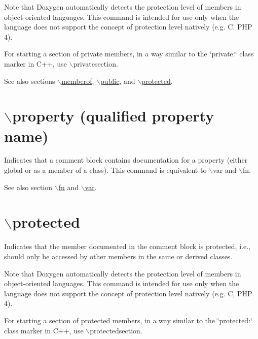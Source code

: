 Note that Doxygen automatically detects the protection level of members in object-\/oriented languages. This command is intended for use only when the language does not support the concept of protection level natively (e.g. C, PHP 4).

For starting a section of private members, in a way similar to the \char`\"{}private:\char`\"{} class marker in C++, use $\backslash$privatesection.

\begin{DoxySeeAlso}{See also}
sections \hyperlink{commands_cmdmemberof}{$\backslash$memberof}, \hyperlink{commands_cmdpublic}{$\backslash$public}, and \hyperlink{commands_cmdprotected}{$\backslash$protected}.
\end{DoxySeeAlso}


 \hypertarget{commands_cmdproperty}{}\section{$\backslash$property (qualified property name)}\label{commands_cmdproperty}
 Indicates that a comment block contains documentation for a property (either global or as a member of a class). This command is equivalent to $\backslash$var and $\backslash$fn.

\begin{DoxySeeAlso}{See also}
section \hyperlink{commands_cmdfn}{$\backslash$fn} and \hyperlink{commands_cmdvar}{$\backslash$var}.
\end{DoxySeeAlso}


 \hypertarget{commands_cmdprotected}{}\section{$\backslash$protected}\label{commands_cmdprotected}
  Indicates that the member documented in the comment block is protected, i.e., should only be accessed by other members in the same or derived classes.

Note that Doxygen automatically detects the protection level of members in object-\/oriented languages. This command is intended for use only when the language does not support the concept of protection level natively (e.g. C, PHP 4).

For starting a section of protected members, in a way similar to the \char`\"{}protected:\char`\"{} class marker in C++, use $\backslash$protectedsection.


